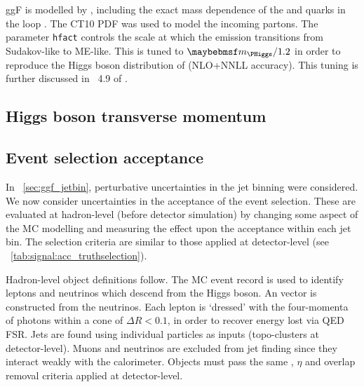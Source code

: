 
\ac{ggF} is modelled by , including the exact mass 
dependence of the \Ptop and \Pbottom quarks in the loop \cite{Powheg-ggF-quarkmasses}. 
The CT10 PDF \cite{CTEQ} was used to model the incoming partons.
The \powhegbox parameter \verb|hfact| controls the scale at which the emission 
transitions from Sudakov-like to ME-like. This is tuned to $\mH/1.2$ in order to 
reproduce the Higgs boson \pt distribution of \hqt \cite{HqT2} (NLO+NNLL accuracy). This 
tuning is further discussed in \Section~4.9 of \Reference \cite{YR2}.



\subsection{Higgs boson transverse momentum}



\subsection{Event selection acceptance}

In \Section~\ref{sec:ggf_jetbin}, perturbative uncertainties in the jet binning were 
considered. We now consider uncertainties in the acceptance of the event selection. These 
are evaluated at hadron-level (\ie before detector simulation) by changing some aspect of 
the MC modelling and measuring the effect upon the acceptance within each jet bin. 
The selection criteria are similar to those applied at detector-level (see 
\Table~\ref{tab:signal:acc_truthselection}).

Hadron-level object definitions follow. The MC event record is used to identify leptons 
and neutrinos which descend from the Higgs boson. An \metvec vector is constructed from 
the neutrinos. Each lepton is `dressed' with the four-momenta of photons within a cone of 
$\Delta R < 0.1$, in order to recover energy lost via QED FSR. Jets are found using 
individual particles as inputs (\cf topo-clusters at detector-level). Muons and neutrinos 
are excluded from jet finding since they interact weakly with the calorimeter. Objects 
must pass the same \pt, $\eta$ and overlap removal criteria applied at detector-level.

